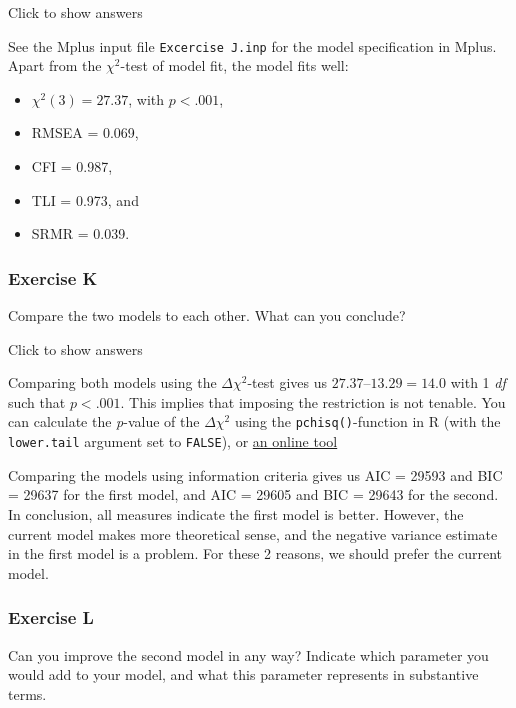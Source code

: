 \documentclass[
]{book}
\providecommand{\tightlist}{%
  \setlength{\itemsep}{0pt}\setlength{\parskip}{0pt}}
\begin{document}
Click to show answers

See the Mplus input file \texttt{Excercise\ J.inp} for the model specification in Mplus. Apart from the \(\chi^{2}\)-test of model fit, the model fits well:

\begin{itemize}
\tightlist
\item
  \(\chi^{2} (3) = 27.37\), with \(p < .001\),
\item
  RMSEA = 0.069,
\item
  CFI = 0.987,
\item
  TLI = 0.973, and
\item
  SRMR = 0.039.
\end{itemize}

\hypertarget{exercise-k}{%
\subsubsection*{Exercise K}\label{exercise-k}}

Compare the two models to each other. What can you conclude?

Click to show answers

Comparing both models using the \(\Delta \chi^{2}\)-test gives us \(27.37 – 13.29 = 14.0\) with 1 \emph{df} such that \(p < .001\). This implies that imposing the restriction is not tenable. You can calculate the \emph{p}-value of the \(\Delta \chi^{2}\) using the \texttt{pchisq()}-function in R (with the \texttt{lower.tail} argument set to \texttt{FALSE}), or \href{http://www.fourmilab.ch/rpkp/experiments/analysis/chiCalc.html}{an online tool}

Comparing the models using information criteria gives us AIC = 29593 and BIC = 29637 for the first model, and AIC = 29605 and BIC = 29643 for the second. In conclusion, all measures indicate the first model is better. However, the current model makes more theoretical sense, and the negative variance estimate in the first model is a problem. For these 2 reasons, we should prefer the current model.

\hypertarget{exercise-l}{%
\subsubsection*{Exercise L}\label{exercise-l}}

Can you improve the second model in any way? Indicate which parameter you would add to your model, and what this parameter represents in substantive terms.
\end{document}

